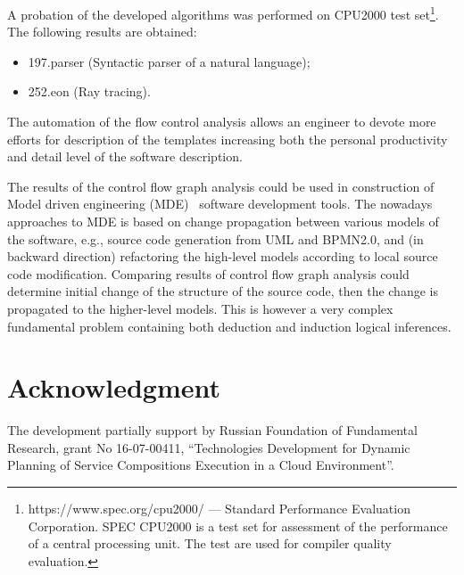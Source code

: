 \documentclass[conference]{IEEEtran}
\begin{document}
A probation of the developed algorithms was performed on CPU2000 test set\footnote{https://www.spec.org/cpu2000/ --- Standard Performance Evaluation Corporation.  SPEC CPU2000 is a test set for assessment of the performance of a central processing unit. The test are used for compiler quality evaluation.}.  The following results are obtained:
\begin{itemize}
\item 197.parser (Syntactic parser of a natural language);
\item 252.eon (Ray tracing).
\end{itemize}

The automation of the flow control analysis allows an engineer to devote more efforts for description of the templates increasing both the personal productivity and detail level of the software description.

The results of the control flow graph analysis could be used in construction of Model driven engineering (MDE)~\cite{mda} software development tools.  The nowadays approaches to MDE is based on change propagation between various models of the software, e.g., source code generation from UML and BPMN2.0, and (in backward direction) refactoring the high-level models according to local source code modification.  Comparing results of control flow graph analysis could determine initial change of the structure of the source code, then the change is propagated to the higher-level models.  This is however a very complex fundamental problem containing both deduction and induction logical inferences.


\section*{Acknowledgment}

The development partially support by Russian Foundation of Fundamental Research, grant No 16-07-00411, ``Technologies Development for Dynamic Planning of Service Compositions Execution in a Cloud Environment''.

\end{document}
